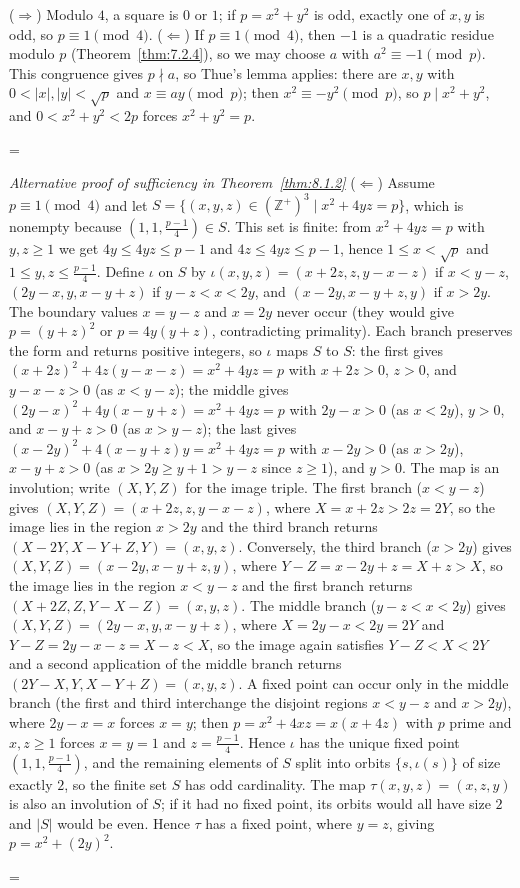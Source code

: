 \documentclass[11pt]{article}
\makeatletter
\theoremstyle{ntstyle}
\let\nt@closedisplay\]
\def\nt@guardedclose{\@ifnextchar\par{\nt@closeafterpar}{\@ifnextchar\end{\postdisplaypenalty\@M\nt@closedisplay}{\nt@closedisplay}}}
\def\nt@closeafterpar\par{\@ifnextchar\par{\nt@closeafterpar}{\@ifnextchar\end{\postdisplaypenalty\@M\nt@closedisplay\par}{\nt@closedisplay\par}}}
\renewenvironment{proof}[1][\proofname]{\par
  \pushQED{\qed}\normalfont\topsep\medskipamount\edef\nt@afterproof{\@endparpenalty=\the\@endparpenalty\relax}\@beginparpenalty\@M\@endparpenalty\@M\let\]\nt@guardedclose\trivlist\item[]\textit{#1\@addpunct{.}} \ignorespaces}{\ifvmode\addpenalty\@M\fi\popQED\nt@afterproof\endtrivlist\@endpefalse}
\newenvironment{altproof}[1][\proofname]{\begin{proof}[#1]\renewcommand{\qedsymbol}{}}{\end{proof}}
\makeatother
\begin{document}
\begin{proof} ($\Rightarrow$) Modulo $4$, a square is $0$
	or $1$; if $p = x^2 + y^2$ is odd, exactly one of $x, y$ is odd, so
	$p \equiv 1 \pmod{4}$. ($\Leftarrow$) If $p \equiv 1 \pmod{4}$, then
	$-1$ is a quadratic residue modulo $p$ (Theorem~\ref{thm:7.2.4}), so we may choose $a$ with $a^2
		\equiv -1 \pmod{p}$. This congruence gives $p\nmid a$, so Thue's
	lemma applies: there are $x, y$ with $0 < |x|,
		|y| < \sqrt{p}$ and $x \equiv a y \pmod{p}$; then $x^2 \equiv -y^2
		\pmod{p}$, so $p \mid x^2 + y^2$, and $0 < x^2 + y^2 < 2p$ forces $x^2
		+ y^2 = p$.

\end{proof}
\begin{altproof}[Alternative proof of sufficiency in Theorem~\ref{thm:8.1.2}] ($\Leftarrow$) Assume $p \equiv 1
		\pmod{4}$ and let $S = \{(x, y, z) \in (\mathbb{Z}^+)^3 \mid x^2 + 4yz =
		p\}$, which is nonempty because $(1, 1, \tfrac{p-1}{4}) \in S$. This set is finite:
	from $x^2+4yz=p$ with $y,z\ge1$ we get $4y\le 4yz\le p-1$ and
	$4z\le 4yz\le p-1$, hence $1\le x<\sqrt{p}$ and $1\le y,z\le\tfrac{p-1}{4}$. Define
	$\iota$ on $S$
	by $\iota(x, y, z) = (x + 2z, z, y - x - z)$ if $x < y - z$, $(2y -
		x, y, x - y + z)$ if $y - z < x < 2y$, and $(x - 2y, x - y + z, y)$ if $x
		> 2y$. The boundary values $x = y - z$ and $x = 2y$ never occur (they
	would give $p = (y+z)^2$ or $p = 4y(y+z)$, contradicting primality).
	Each branch preserves the form and returns positive integers, so
	$\iota$ maps $S$ to $S$: the first gives
	$(x+2z)^2+4z(y-x-z)=x^2+4yz=p$ with $x+2z>0$, $z>0$, and $y-x-z>0$
	(as $x<y-z$); the middle gives $(2y-x)^2+4y(x-y+z)=x^2+4yz=p$ with
	$2y-x>0$ (as $x<2y$), $y>0$, and $x-y+z>0$ (as $x>y-z$); the last
	gives $(x-2y)^2+4(x-y+z)y=x^2+4yz=p$ with $x-2y>0$ (as $x>2y$),
	$x-y+z>0$ (as $x>2y\ge y+1>y-z$ since $z\ge1$), and $y>0$. The map is an involution; write $(X,Y,Z)$ for the image triple. The first branch ($x<y-z$) gives $(X,Y,Z)=(x+2z,z,y-x-z)$, where $X=x+2z>2z=2Y$, so the image lies in the region $x>2y$ and the third branch returns $(X-2Y,X-Y+Z,Y)=(x,y,z)$. Conversely, the third branch ($x>2y$) gives $(X,Y,Z)=(x-2y,x-y+z,y)$, where $Y-Z=x-2y+z=X+z>X$, so the image lies in the region $x<y-z$ and the first branch returns $(X+2Z,Z,Y-X-Z)=(x,y,z)$. The middle branch ($y-z<x<2y$) gives $(X,Y,Z)=(2y-x,y,x-y+z)$, where $X=2y-x<2y=2Y$ and $Y-Z=2y-x-z=X-z<X$, so the image again satisfies $Y-Z<X<2Y$ and a second application of the middle branch returns $(2Y-X,Y,X-Y+Z)=(x,y,z)$. A fixed point can occur only in the middle branch (the first and third interchange the disjoint regions $x<y-z$ and $x>2y$), where $2y-x=x$ forces $x=y$; then $p=x^2+4xz=x(x+4z)$ with $p$ prime and $x,z\ge1$ forces $x=y=1$ and $z=\tfrac{p-1}{4}$. Hence $\iota$ has the unique fixed point $(1,1,\tfrac{p-1}{4})$, and the remaining elements of $S$ split into orbits $\{s,\iota(s)\}$ of size exactly $2$, so the finite set $S$ has odd cardinality. The map $\tau(x, y, z) = (x, z, y)$ is also an involution of $S$; if it had no fixed point, its orbits would all have size $2$ and $|S|$ would be even. Hence $\tau$ has a
	fixed point, where $y = z$, giving $p = x^2 + (2y)^2$.

\end{altproof}
\end{document}
